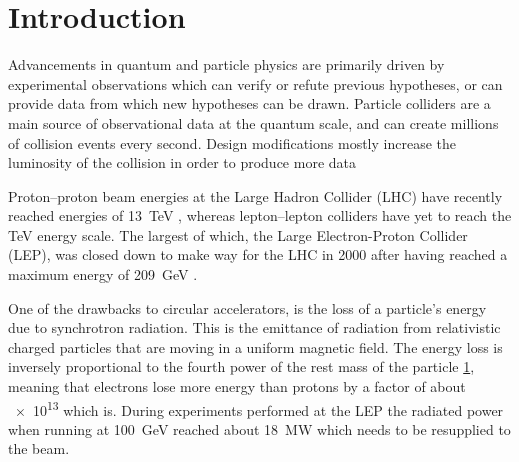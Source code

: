 
\section{Introduction}

Advancements in quantum and particle physics are primarily driven by
experimental observations which can verify or refute previous hypotheses, or
can provide data from which new hypotheses can be drawn.
Particle colliders are a main source of observational data at the quantum
scale, and can create millions of collision events every second.
Design modifications mostly increase the luminosity of the collision in order
to produce more data


Proton--proton beam energies at the Large Hadron Collider (LHC) have recently
reached energies of \SI{13}{\tera\electronvolt} \cite{o2015first}, whereas
lepton--lepton colliders have yet to reach the \si{\tera\electronvolt} energy
scale. The largest of which, the Large Electron-Proton Collider (LEP), was
closed down to make way for the LHC in \num{2000} after having reached a
maximum energy of \SI{209}{\giga\electronvolt} \cite{Barate2003sz}.


One of the drawbacks to circular accelerators,
is the loss of a particle's energy due to synchrotron radiation.  This is the
emittance of radiation from relativistic charged particles that are moving in a
uniform magnetic field. The energy loss is inversely proportional to the fourth
power of the rest mass of the particle \ref{}, meaning that electrons lose more
energy than protons by a factor of about \num{e13} which is.  During experiments
performed at the LEP the radiated power when running at
\SI{100}{\giga\electronvolt} reached about \SI{18}{\mega\watt} which needs to be
resupplied to the beam. %

